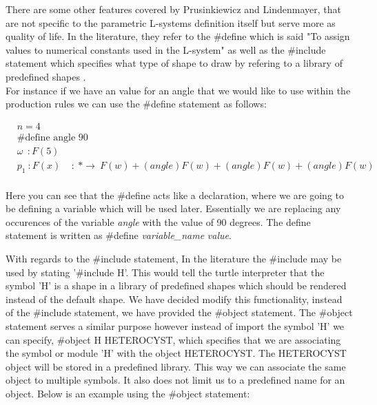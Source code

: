 There are some other features covered by Prusinkiewicz and Lindenmayer, that are not specific to the parametric L-systems definition itself but serve more as quality of life. In the literature, they refer to the \#define which is said "To assign values to numerical constants used in the L-system" as well as the \#include statement which specifies what type of shape to draw by refering to a library of predefined shapes \cite{prusinkiewicz2012algorithmic}. \\
For instance if we have an value for an angle that we would like to use within the production rules we can use the \#define statement as follows:

\vspace{5mm}

\begin{equation} \label{define statement example}
\begin{aligned}
	&n=4 \\
	&\textrm{\#define angle 90}\\
	&\omega~~ : F(5)\\
	&p_1~ :  F(x)~~~~~ :~ * \rightarrow~ F(w)+(angle)F(w)+(angle)F(w)+(angle)F(w)\\
\end{aligned}
\end{equation}

\vspace{5mm}

Here you can see that the \#define acts like a declaration, where we are going to be defining a variable which will be used later. Essentially we are replacing any occurences of the variable \textit{angle} with the value of 90 degrees. The define statement is written as  \#define \textit{variable\_name} \textit{value}. \\

\vspace{5mm}

With regards to the \#include statement, In the literature the \#include may be used by stating '\#include H'. This would tell the turtle interpreter that the symbol 'H' is a shape in a library of predefined shapes which should be rendered instead of the default shape. We have decided modify this functionality, instead of the \#include statement, we have provided the \#object statement. The \#object statement serves a similar purpose however instead of import the symbol 'H' we can specify, \#object H HETEROCYST, which specifies that we are associating the symbol or module 'H' with the object HETEROCYST. The HETEROCYST object will be stored in a predefined library. This way we can associate the same object to multiple symbols. It also does not limit us to a predefined name for an object. Below is an example using the \#object statement: \\

